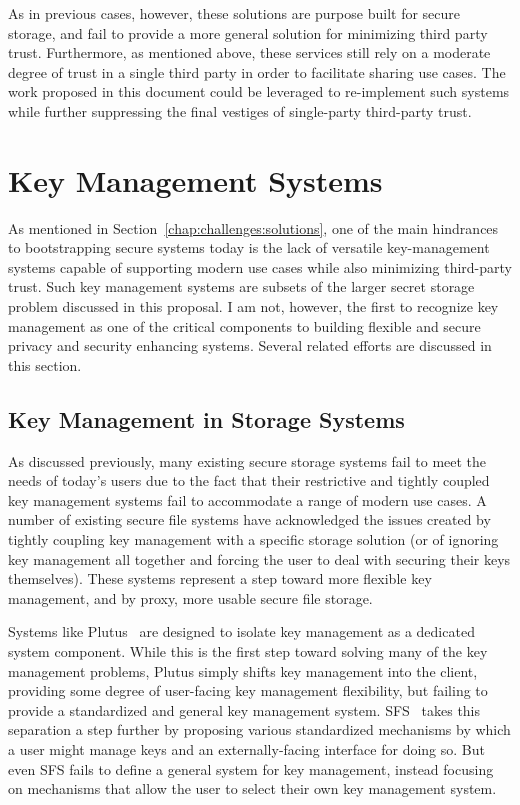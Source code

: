 As in previous cases, however, these solutions are purpose built for
secure storage, and fail to provide a more general solution for
minimizing third party trust. Furthermore, as mentioned above, these
services still rely on a moderate degree of trust in a single third
party in order to facilitate sharing use cases. The work proposed in
this document could be leveraged to re-implement such systems while
further suppressing the final vestiges of single-party third-party
trust.

\section{Key Management Systems}
\label{chap:related:keymgmt}

As mentioned in Section~\ref{chap:challenges:solutions}, one of the
main hindrances to bootstrapping secure systems today is the lack of
versatile key-management systems capable of supporting modern use
cases while also minimizing third-party trust. Such key management
systems are subsets of the larger secret storage problem discussed in
this proposal. I am not, however, the first to recognize key
management as one of the critical components to building flexible and
secure privacy and security enhancing systems. Several related efforts
are discussed in this section.

\subsection{Key Management in Storage Systems}

As discussed previously, many existing secure storage systems fail to
meet the needs of today's users due to the fact that their restrictive
and tightly coupled key management systems fail to accommodate a range
of modern use cases. A number of existing secure file systems have
acknowledged the issues created by tightly coupling key management
with a specific storage solution (or of ignoring key management all
together and forcing the user to deal with securing their keys
themselves). These systems represent a step toward more flexible key
management, and by proxy, more usable secure file storage.

Systems like Plutus~\cite{kallahalla2003} are designed to isolate key
management as a dedicated system component. While this is the first
step toward solving many of the key management problems, Plutus simply
shifts key management into the client, providing some degree of
user-facing key management flexibility, but failing to provide a
standardized and general key management
system. SFS~\cite{mazieres1999} takes this separation a step further
by proposing various standardized mechanisms by which a user might
manage keys and an externally-facing interface for doing so. But even
SFS fails to define a general system for key management, instead
focusing on mechanisms that allow the user to select their own key
management system.

